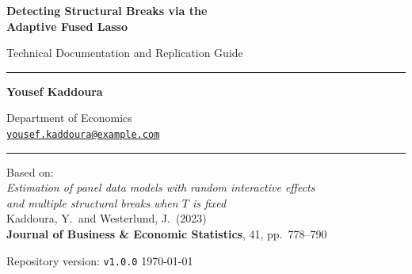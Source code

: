 \documentclass[12pt, a4paper]{article}
\theoremstyle{plain}
\theoremstyle{definition}
\theoremstyle{remark}
\begin{document}

\begin{titlepage}
\centering
\vspace*{1.5cm}

{\LARGE\bfseries Detecting Structural Breaks via the\\[0.4em]
Adaptive Fused Lasso\par}

\vspace{0.5cm}
{\large Technical Documentation and Replication Guide\par}

\vspace{1.5cm}

\rule{0.6\textwidth}{0.8pt}

\vspace{1cm}

{\large \textbf{Yousef Kaddoura}\par}
\vspace{0.3cm}
{\normalsize
Department of Economics\\
\vspace{0.15cm}
\href{mailto:yousef.kaddoura@example.com}{\texttt{yousef.kaddoura@example.com}}
\par}

\vspace{1cm}

\rule{0.6\textwidth}{0.8pt}

\vspace{1cm}

{\normalsize
Based on:\\[0.3em]
\textit{Estimation of panel data models with random interactive effects\\
and multiple structural breaks when $T$ is fixed}\\[0.3em]
Kaddoura, Y.\ and Westerlund, J.\ (2023)\\
\textbf{Journal of Business \& Economic Statistics}, 41, pp.\ 778--790
\par}

\vspace{2cm}

{\normalsize Repository version: \texttt{v1.0.0} \hfill \today\par}

\end{titlepage}

\tableofcontents
\newpage
\end{document}
